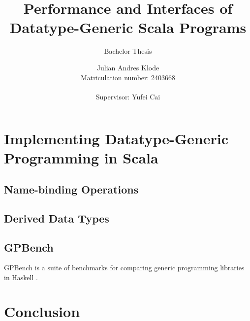 \documentclass[abstracton,parskip=half]{scrreprt}
\author{Julian Andres Klode\\Matriculation number: 2403668\\\\Supervisor: Yufei Cai}
\title{Performance and Interfaces of Datatype-Generic Scala Programs}
\subtitle{Bachelor Thesis}
\date{}
\begin{document}
    \maketitle{}
    

    \tableofcontents{}
    \clearpage
    \setcounter{page}{1}

    

    \chapter{Implementing Datatype-Generic Programming in Scala}
    \section{Name-binding Operations}
    \section{Derived Data Types}
    \section{GPBench}
    GPBench is a suite of benchmarks for comparing generic programming
    libraries in Haskell \cite{DBLP:conf/haskell/RodriguezJJGKO08}.

    \chapter{Conclusion}

    
    
\end{document}
